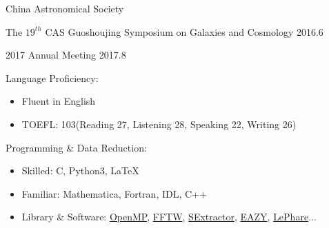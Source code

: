 \documentclass[10pt,a4paper]{article}
\begin{document}
\headedsection
  {China Astronomical Society}
  {}
  {
    \headedsubsection
    {The $19^{th}$ CAS Guoshoujing Symposium on Galaxies and Cosmology}
    {2016.6}
    {
    }

    \headedsubsection
    {2017 Annual Meeting}
    {2017.8}
    {
    }
  }



\spacedhrule{0.4em}{0.8em}

\headedsection
  {Language Proficiency:}
  {}
  {
  \begin{itemize}
    \item Fluent in English
    \item TOEFL: 103(Reading 27, Listening 28, Speaking 22, Writing 26)
  \end{itemize}
  }

\headedsection
  {Programming \& Data Reduction:}
  {}
  {
  \begin{itemize}
    \item Skilled: C, Python3, \LaTeX
    \item Familiar: Mathematica, Fortran, IDL, C++
    \item Library \& Software: \href{https://www.openmp.org/}{OpenMP}, \href{http://www.fftw.org/}{FFTW}, \href{https://www.astromatic.net/software/sextractor}{SExtractor}, \href{https://github.com/gbrammer/eazy-photoz.git}{EAZY}, \href{http://www.cfht.hawaii.edu/~arnouts/LEPHARE/lephare.html}{LePhare}...
  \end{itemize}  
  }

\end{document}
